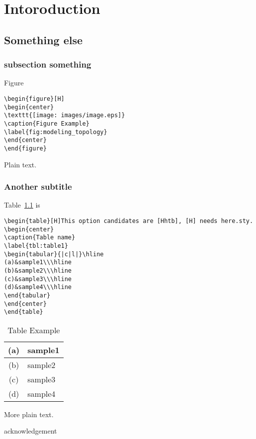 \documentclass[11pt,a4j]{report}
\affiliation{School of Engineering Science, Osaka University}%
\begin{document}
\makepreambles

\chapter{Intoroduction}
\section{Something else}


\subsection{subsection something}
Figure
\begin{verbatim}
\begin{figure}[H]
\begin{center}
\texttt{[image: images/image.eps]}
\caption{Figure Example}
\label{fig:modeling_topology}
\end{center}
\end{figure}
\end{verbatim}
Plain text.


\subsection{Another subtitle}
Table~\ref{tbl:table1} is 
\begin{verbatim}
\begin{table}[H]This option candidates are [Hhtb], [H] needs here.sty.
\begin{center}
\caption{Table name}
\label{tbl:table1}
\begin{tabular}{|c|l|}\hline
(a)&sample1\\\hline
(b)&sample2\\\hline
(c)&sample3\\\hline
(d)&sample4\\\hline
\end{tabular}
\end{center}
\end{table}
\end{verbatim}
\begin{table}[H]
\begin{center}
\caption{Table Example}
\label{tbl:table1}
\begin{tabular}{|c|l|}\hline
(a)&sample1\cite{AODV}\\\hline
(b)&sample2\cite{DSR}\\\hline
(c)&sample3\cite{OLSR}\\\hline
(d)&sample4\cite{mycom}\cite{ISSTA1994}\\\hline
\end{tabular}
\end{center}
\end{table}
More plain text\cite{ICTE2007}.



\acknowledgement%
acknowledgement






\end{document}
